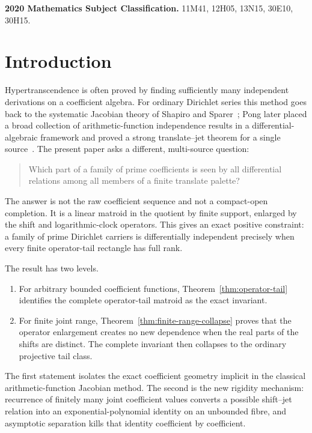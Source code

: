 \documentclass[11pt]{article}
\theoremstyle{definition}
\theoremstyle{remark}
\begin{document}
\medskip
\noindent\textbf{2020 Mathematics Subject Classification.}
11M41, 12H05, 13N15, 30E10, 30H15.

\section{Introduction}

Hypertranscendence is often proved by finding sufficiently many independent derivations on a
coefficient algebra.  For ordinary Dirichlet series this method goes back to the systematic
Jacobian theory of Shapiro and Sparer~\cite{ShapiroSparer1986}; Pong later placed a broad
collection of arithmetic-function independence results in a differential-algebraic framework
and proved a strong translate--jet theorem for a single source~\cite{Pong2016}.  The present
paper asks a different, multi-source question:

\begin{quote}
Which part of a family of prime coefficients is seen by all differential relations among all
members of a finite translate palette?
\end{quote}

The answer is not the raw coefficient sequence and not a compact-open completion.  It is a
linear matroid in the quotient by finite support, enlarged by the shift and logarithmic-clock
operators.  This gives an exact positive constraint: a family of prime Dirichlet carriers is
differentially independent precisely when every finite operator-tail rectangle has full rank.

The result has two levels.

\begin{enumerate}[label=(\roman*),leftmargin=2.2em]
  \item For arbitrary bounded coefficient functions, Theorem~\ref{thm:operator-tail} identifies
  the complete operator-tail matroid as the exact invariant.
  \item For finite joint range, Theorem~\ref{thm:finite-range-collapse} proves that the operator
  enlargement creates no new dependence when the real parts of the shifts are distinct.
  The complete invariant then collapses to the ordinary projective tail class.
\end{enumerate}

The first statement isolates the exact coefficient geometry implicit in the classical
arithmetic-function Jacobian method.  The second is the new rigidity mechanism: recurrence of
finitely many joint coefficient values converts a possible shift--jet relation into an
exponential-polynomial identity on an unbounded fibre, and asymptotic separation kills that
identity coefficient by coefficient.
\end{document}
